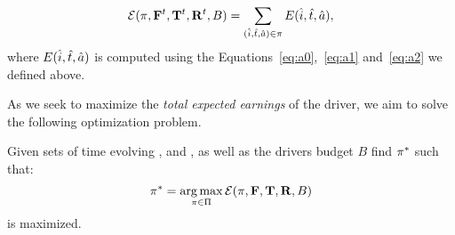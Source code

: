 \begin{equation}\label{eq:totalexpectedearnings}
\mathcal{E} (\pi,{\mathbf{F}}^{t},{\mathbf{T}}^{t},{\mathbf{R}}^{t},B) = \sum_{(\hat{i},\hat{t},\hat{a})\in\pi}E({\hat{i}},{\hat{t}},{\hat{a}}),
\end{equation}
where $E({\hat{i}},{\hat{t}},{\hat{a}})$ is computed
using the Equations~\eqref{eq:a0},~\eqref{eq:a1} and~\eqref{eq:a2} we defined above.

As we seek to maximize the \emph{total expected earnings} of the driver,
we aim to solve the following optimization problem.

\begin{problem}[{\originalproblem}]\label{problem:theproblem}
Given sets of time evolving {\empiricaltransitionmatrix}, {\traveltimematrix} and {\rewardsmatrix}, as well as the drivers budget $B$
find $\pi^\ast$
such that:
\[
\pi^\ast = \operatorname*{arg\,max}_{\pi\in \Pi}\mathcal{E}(\pi,{\mathbf{F}},{\mathbf{T}},{\mathbf{R}},B)
\]
is maximized.
\end{problem}

